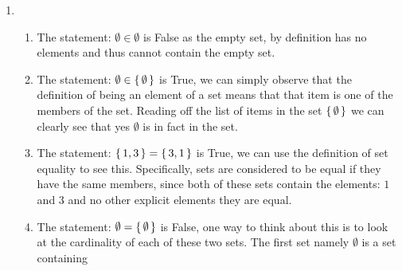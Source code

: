 \documentclass[12pt]{article}
\makeatletter
\newcommand*{\arabicodd}[1]{%
  \expandafter\@arabicodd\csname c@#1\endcsname
}
\newcommand*{\@arabicodd}[1]{%
  \@arabic{\numexpr(#1)*2-1\relax}%
}
\makeatother
\begin{document}
\begin{enumerate}[label=2.\arabicodd*]
\begin{enumerate}[label=(\alph*)]
\begin{proof}
                the statement $5x+3$ is an odd integer \emph{is} true when
                x is an even integer.
              \end{proof}
              \begin{proof}
                $5x+3$ is not an odd integer when x is an odd integer.
                For the sake of simplicity and time we can simply prove this
                by finding a single counter example; it is a relatively simple
                matter to establish a more long-form proof, but doing so is
                unnecessary in this case. If we let $x=1$ then we have that
                $5x+3=8$ which is not an odd integer, since we cannot write 8
                as $2$ times some integer $k$ + 1. In fact we can write $8$ as $2$
                times $4$ which is an even integer not an odd integer.
              \end{proof}
        \item The sentence: ``What an impossible question!'' is not a valid
              statement as it is simply an exclamatory sentence.
      \end{enumerate}
    \item
      \begin{enumerate}[label=(\alph*)]
        \item The statement: $\emptyset \in \emptyset$ is False as the empty
              set, by definition has no elements and thus cannot contain the
              empty set.
        \item The statement: $\emptyset \in \set{\emptyset}$ is True, we can
              simply observe that the definition of being an element of a set
              means that that item is one of the members of the set. Reading
              off the list of items in the set $\set{\emptyset}$ we can clearly
              see that yes $\emptyset$ is in fact in the set.
        \item The statement: $\set{1, 3} = \set{3, 1}$ is True, we can
              use the definition of set equality to see this. Specifically,
              sets are considered to be equal if they have the same members,
              since both of these sets contain the elements: $1$ and $3$ and
              no other explicit elements they are equal.
        \item The statement: $\emptyset = \set{\emptyset}$ is False, one way
              to think about this is to look at the cardinality of each of these
              two sets. The first set namely $\emptyset$ is a set containing

\end{enumerate}
\end{enumerate}
\end{document}
